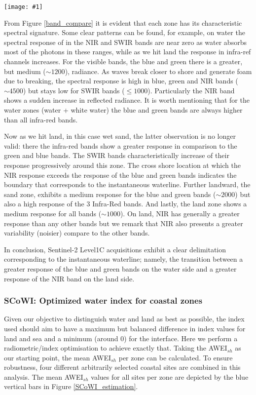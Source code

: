 \documentclass[remotesensing,article,submit,pdftex,moreauthors]{Definitions/mdpi}
\newcommand{\myfigure}[4]{
    \begin{figure*}[ht!]
        \centering
        \texttt{[image: \#1]}	 
        \caption{\itshape#2}
        \label{#3}
    \end{figure*} 
}
\begin{document}
\myfigure{img/band_compare_CAPBRETON.png}{Example of the spectral response along the 5 cross shore zones. The instantaneous waterline (land/water limit marker) is our target here.}{band_compare}{1}

From Figure \ref{band_compare} it is evident that each zone has its characteristic spectral signature. Some clear patterns can be found, for example, on water the spectral response of in the NIR and SWIR bands are near zero as water absorbs most of the photons in these ranges, while as we hit land the response in infra-ref channels increases. For the visible bands, the blue and green there is a greater, but medium ($\sim 1200$), radiance. As waves break closer to shore and generate foam due to breaking, the spectral response is high in blue, green and NIR bands ($\sim 4500$) but stays low for SWIR bands ($\le 1000$). Particularly the NIR band shows a sudden increase in reflected radiance. It is worth mentioning that for the water zones (water + white water) the blue and green bands are always higher than all infra-red bands. 

Now as we hit land, in this case wet sand, the latter observation is no longer valid: there the  infra-red bands show a greater response in comparison to the green and blue bands. The SWIR bands characteristically increase of their response progressively around this zone. The cross shore location at which the NIR response exceeds the response of the blue and green bands indicates the boundary that corresponds to the instantaneous waterline. Further landward, the sand zone, exhibits a medium response for the blue and green bands ($\sim 2000$) but also a high response of the 3 Infra-Red bands. And lastly, the land zone shows a medium response for all bands ($\sim 1000$). On land, NIR has generally a greater response than any other bands but we remark that NIR also presents a greater variability (noisier) compare to the other bands.

In conclusion, Sentinel-2 Level1C acquisitions exhibit a clear delimitation corresponding to the instantaneous waterline; namely, the transition between a greater response of the blue and green bands on the water side and a greater response of the NIR band on the land side.

\subsubsection{SCoWI: Optimized water index for coastal zones}\label{SCOWI_sec}
Given our objective to distinguish water and land as best as possible, the index used should aim to have a maximum but balanced difference in index values for land and sea and a minimum (around 0) for the interface. Here we perform a radiometric/index optimisation to achieve exactly that. Taking the AWEI$_{sh}$ as our starting point, the mean AWEI$_{sh}$ per zone can be calculated. To ensure robustness, four different arbitrarily selected coastal sites are combined in this analysis. The mean AWEI$_{sh}$ values for all sites per zone are depicted by the blue vertical bars in Figure \ref{SCoWI_estimation}. 
\end{document}
